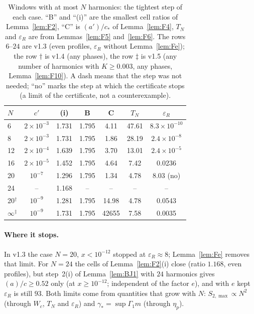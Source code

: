 \begin{table}
\caption{Windows with at most $N$ harmonics: the tightest step of each case. ``B'' and ``(i)'' are the smallest cell ratios of Lemma~\ref{lem:F2}, ``C'' is
$(a')/c_*$ of Lemma~\ref{lem:F4}, $T_N$ and $\varepsilon_R$ are from Lemmas~\ref{lem:F5} and~\ref{lem:F6}. The rows $6$--$24$ are v1.3 (even profiles, $\varepsilon_R$ without
Lemma~\ref{lem:Fe}); the row $\dagger$ is v1.4 (any phases), the row $\ddagger$ is v1.5 (any number of harmonics with $K\ge0.003$, any phases, Lemma~\ref{lem:F10}). A dash means that the step was not needed;
``no'' marks the step at which the certificate stops (a limit of the certificate, not a counterexample).}
\label{tab:FN}
\setlength{\tabcolsep}{3pt}
\begin{ruledtabular}
\begin{tabular}{lcccccc}
$N$ & $c'$ & (i) & B & C & $T_N$ & $\varepsilon_R$\\ \hline
6 & $2\times10^{-3}$ & 1.731 & 1.795 & 4.11 & 47.61 & $8.3\times10^{-10}$\\
8 & $2\times10^{-3}$ & 1.731 & 1.795 & 1.86 & 28.19 & $2.4\times10^{-8}$\\
12 & $2\times10^{-4}$ & 1.639 & 1.795 & 3.70 & 13.01 & $2.4\times10^{-5}$\\
16 & $2\times10^{-5}$ & 1.452 & 1.795 & 4.64 & 7.42 & 0.0236\\
20 & $10^{-7}$ & 1.296 & 1.795 & 1.34 & 4.78 & 8.03 (no)\\
24 & -- & 1.168 & -- & -- & -- & --\\ \hline
20$^\dagger$ & $10^{-9}$ & 1.281 & 1.795 & 14.98 & 4.78 & 0.0543\\
$\infty^\ddagger$ & $10^{-9}$ & 1.731 & 1.795 & 42655 & 7.58 & 0.0035\\
\end{tabular}
\end{ruledtabular}
\end{table}

\paragraph*{Where it stops.}
In v1.3 the case $N=20$, $x<10^{-12}$ stopped at $\varepsilon_R\approx8$; Lemma~\ref{lem:Fe} removes that limit. For $N=24$ the cells of Lemma~\ref{lem:F2}(i) close (ratio $1.168$, even profiles), but
step~2(i) of Lemma~\ref{lem:BJ1} with $24$ harmonics gives $(a)/c\ge0.52$ only (at $x\ge10^{-12}$; independent of the factor $e$), and with $e$ kept $\varepsilon_R$ is still $93$. Both limits come from quantities that grow with $N$: $S_{2,\max}\propto N^2$ (through
$W_c$, $T_N$ and $\varepsilon_R$) and $\gamma_*=\sup\Gamma_1m$ (through $\eta_p$).

